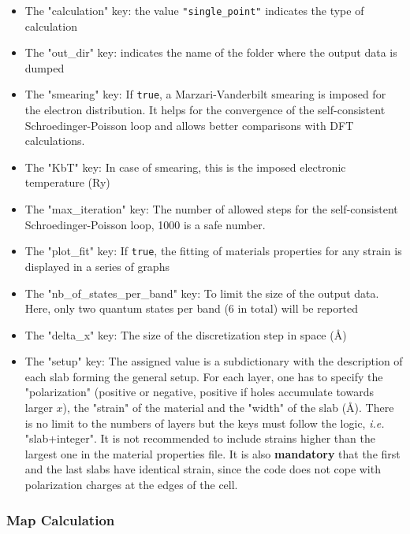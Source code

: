 \documentclass[a4paper,12pt]{article}
\newcommand{\angstrom}{\textup{\AA}}
\begin{document}
\begin{itemize}
\item The "calculation" key: the value \texttt{"single\_point"} indicates the type of calculation

\item The "out\_dir" key: indicates the name of the folder where the output data is dumped

\item The "smearing" key: If \texttt{true}, a Marzari-Vanderbilt smearing is imposed for the electron distribution. It helps for the convergence of the self-consistent Schroedinger-Poisson loop and allows better comparisons with DFT calculations.

\item The "KbT" key: In case of smearing, this is the imposed electronic temperature (Ry)

\item The "max\_iteration" key: The number of allowed steps for the self-consistent Schroedinger-Poisson loop, 1000 is a safe number.

\item The "plot\_fit" key: If \texttt{true}, the fitting of materials properties for any strain is displayed in a series of graphs

\item The "nb\_of\_states\_per\_band" key: To limit the size of the output data. Here, only two quantum states per band (6 in total) will be reported

\item The "delta\_x" key: The size of the discretization step in space (\angstrom)

\item The "setup" key: The assigned value is a subdictionary with the description of each slab forming the general setup. For each layer, one has to specify the "polarization" (positive or negative, positive if holes accumulate towards larger $x$), the "strain" of the material and the "width" of the slab (\angstrom). There is no limit to the numbers of layers but the keys must follow the logic, \textit{i.e.} "slab+integer". It is not recommended to include strains higher than the largest one in the material properties file. It is also \textbf{mandatory} that the first and the last slabs have identical strain, since the code does not cope with polarization charges at the edges of the cell.
\end{itemize}

\subsubsection{Map Calculation}
\end{document}

